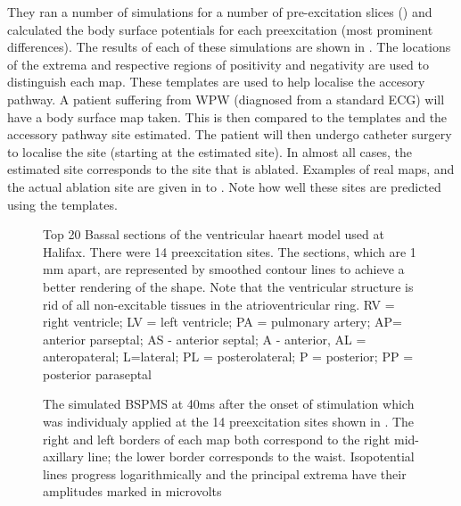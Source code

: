 They ran a number of simulations for a number of pre-excitation slices () and calculated the body surface potentials for each preexcitation
(most prominent differences).  The results of each of these simulations are 
shown in . The locations
  of the extrema and respective regions of positivity and negativity are used
  to distinguish each map.  These templates are used to help localise the
  accesory pathway.  A patient suffering from WPW (diagnosed from a standard
 ECG) will have a body surface map taken.  This is then compared to the
 templates and the accessory pathway site estimated.  The patient will then
 undergo catheter surgery to localise the  site (starting at the estimated
 site).  In almost all cases, the estimated site corresponds to the site that
 is ablated.  Examples of real maps, and the actual ablation site
 are given in  to  
.  Note how well these sites are predicted using
  the templates. 

\begin{figure}[htbp] \centering
  \caption[Halifax Heart Model]{Top 20 Bassal sections of the ventricular
    haeart model used at Halifax.  There were 14 preexcitation sites.  The
    sections, which are 1 mm apart, are represented by smoothed contour lines
    to achieve a better rendering of the shape.  Note that the ventricular
    structure is rid of all non-excitable tissues in the atrioventricular ring.
    RV = right ventricle; LV = left ventricle; PA = pulmonary artery; AP=
    anterior parseptal; AS - anterior septal; A - anterior, AL =
    anteropateral; L=lateral; PL = posterolateral; P = posterior; PP =
    posterior paraseptal }
  \label{fig:hal-heart-model}
\end{figure}

\begin{figure}[htbp] \centering
  \caption[Simulated WPW maps]{The simulated BSPMS at 40ms after the onset of
    stimulation which was individualy applied at the 14 preexcitation sites
    shown in  .  The right and left borders of each
      map both correspond to the right mid-axillary line; the lower border
      corresponds to the waist.  Isopotential lines progress logarithmically
      and the principal extrema have their amplitudes marked in microvolts }
  \label{fig:hal-bspm-template}
\end{figure}


